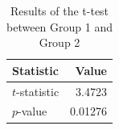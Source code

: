 \begin{table}[h!]
\centering
\begin{tabular}{lr}
\toprule
Statistic & Value \\
\midrule
$t$-statistic & 3.4723 \\
$p$-value & 0.01276 \\
\bottomrule
\end{tabular}
\caption{Results of the t-test between Group 1 and Group 2}
\label{tab:ttest_results}
\end{table}
